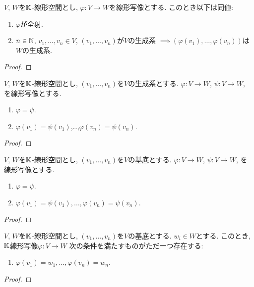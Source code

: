 \begin{prop}
  $V$, $W$を$\mathbb{K}$-線形空間とし,
  $\varphi\colon V\to W$を線形写像とする.
  このとき以下は同値:
  \begin{enumerate}
  \item $\varphi$が全射.
  \item $n\in \mathbb{N}$, $v_1,\ldots,v_n\in V$,
    $(v_1,\ldots,v_n)$が$V$の生成系
    $\implies (\varphi(v_1),\ldots,\varphi(v_n))$は$W$の生成系.
  \end{enumerate}
\end{prop}
\begin{proof}\end{proof}

\begin{prop}
  $V$, $W$を$\mathbb{K}$-線形空間とし,
  $(v_1,\ldots,v_n)$を$V$の生成系とする.
  $\varphi\colon V\to W$,
  $\psi\colon V\to W$,
  を線形写像とする.
  \begin{enumerate}
  \item $\varphi=\psi$.
  \item $\varphi(v_1)=\psi(v_1)$,\ldots,$\varphi(v_n)=\psi(v_n)$.
  \end{enumerate}
\end{prop}
\begin{proof}\end{proof}

\begin{cor}
  $V$, $W$を$\mathbb{K}$-線形空間とし,
  $(v_1,\ldots,v_n)$を$V$の基底とする.
  $\varphi\colon V\to W$,
  $\psi\colon V\to W$,
  を線形写像とする.
  \begin{enumerate}
  \item $\varphi=\psi$.
  \item $\varphi(v_1)=\psi(v_1),\ldots,\varphi(v_n)=\psi(v_n)$.
  \end{enumerate}
\end{cor}
\begin{proof}\end{proof}

\begin{cor}
  $V$, $W$を$\mathbb{K}$-線形空間とし,
  $(v_1,\ldots,v_n)$を$V$の基底とする.
  $w_i\in W$とする.
  このとき,
  $\mathbb{K}$線形写像$\varphi\colon V\to W$
  次の条件を満たすものがただ一つ存在する:
  \begin{enumerate}
  \item $\varphi(v_1)=w_1,\ldots,\varphi(v_n)=w_n$.
  \end{enumerate}
\end{cor}
\begin{proof}\end{proof}


